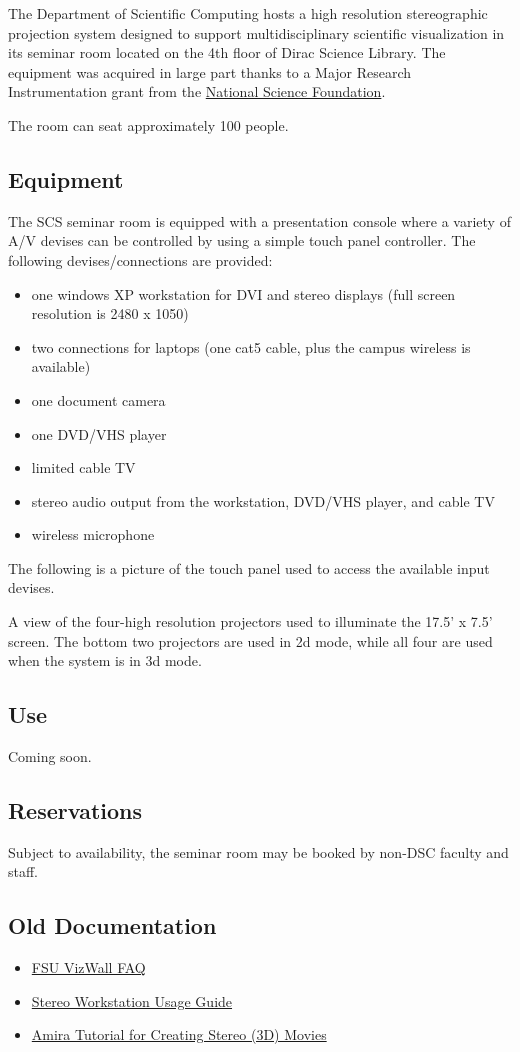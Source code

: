 \documentclass[12pt,a4paper]{article}
\begin{document}
The Department of Scientific Computing hosts a high resolution stereographic projection system designed to support multidisciplinary scientific visualization in its seminar room located on the 4th floor of Dirac Science Library. The equipment was acquired in large part thanks to a Major Research Instrumentation grant from the \href{https://www.nsf.gov/}{National Science Foundation}.

The room can seat approximately 100 people.

\subsection*{Equipment}
The SCS seminar room is equipped with a presentation console where a variety of A/V devises can be controlled by using a simple touch panel controller. The following devises/connections are provided:
\begin{itemize}
    \item one windows XP workstation for DVI and stereo displays (full screen resolution is 2480 x 1050)
    \item two connections for laptops (one cat5 cable, plus the campus wireless is available)
    \item one document camera
    \item one DVD/VHS player
    \item limited cable TV
    \item stereo audio output from the workstation, DVD/VHS player, and cable TV
    \item wireless microphone
\end{itemize}
The following is a picture of the touch panel used to access the available input devises.

A view of the four-high resolution projectors used to illuminate the 17.5' x 7.5' screen. The bottom two projectors are used in 2d mode, while all four are used when the system is in 3d mode.

\subsection*{Use}
Coming soon.

\subsection*{Reservations}
Subject to availability, the seminar room may be booked by non-DSC faculty and staff.

\subsection*{Old Documentation}
\begin{itemize}
    \item \href{http://www.sc.fsu.edu/SciVis/VizWall/VizWall_FAQ.php}{FSU VizWall FAQ}
    \item \href{http://www.sc.fsu.edu/SciVis/Stereo_How-To/html/index.html}{Stereo Workstation Usage Guide}
    \item \href{http://www.sc.fsu.edu/SciVis/Amira/html/index.html}{Amira Tutorial for Creating Stereo (3D) Movies}
\end{itemize}
\end{document}
